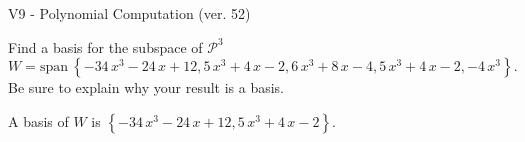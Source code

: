 \begin{exercise}
  \begin{exerciseTitle}V9 - Polynomial Computation (ver. 52)\end{exerciseTitle}
  \begin{exerciseStatement}
    Find a basis for the subspace of \(\mathcal{P}^3\) 
\[W=\mathrm{span}\ \left\{-34 \, x^{3} - 24 \, x + 12 , 5 \, x^{3} + 4 \, x - 2 , 6 \, x^{3} + 8 \, x - 4 , 5 \, x^{3} + 4 \, x - 2 , -4 \, x^{3}\right\}.\]
 Be sure to explain why your result is a basis.


  \end{exerciseStatement}
  \begin{exerciseAnswer}
   A basis of \(W\) is  \(\left\{-34 \, x^{3} - 24 \, x + 12 , 5 \, x^{3} + 4 \, x - 2\right\}\).
  


  \end{exerciseAnswer}
\end{exercise}